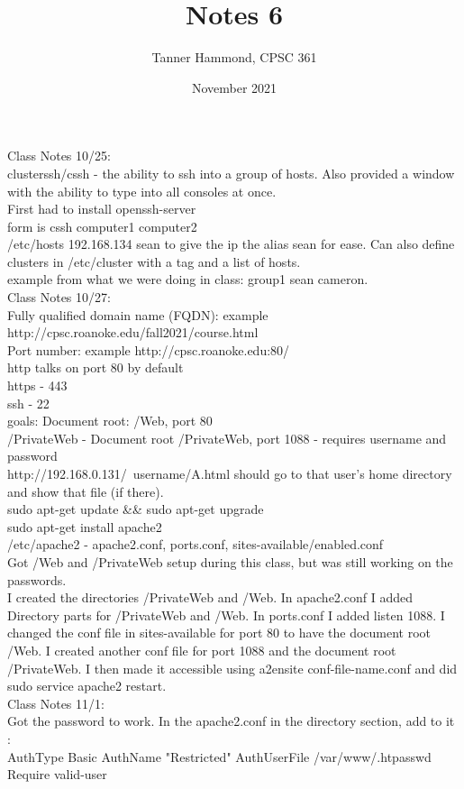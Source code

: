 \documentclass{article}
\title{Notes 6}
\author{Tanner Hammond, CPSC 361}
\date{November 2021}
\begin{document}
\maketitle

Class Notes 10/25:\\
clusterssh/cssh - the ability to ssh into a group of hosts. Also provided a window with the ability to type into all consoles at once. \\
First had to install openssh-server \\
form is cssh computer1 computer2 \\
/etc/hosts  192.168.134 sean to give the ip the alias sean for ease.
Can also define clusters in /etc/cluster with a tag and a list of hosts. \\
example from what we were doing in class: group1 sean cameron. \\


Class Notes 10/27:\\
Fully qualified domain name (FQDN): example http://cpsc.roanoke.edu/fall2021/course.html \\
Port number: example http://cpsc.roanoke.edu:80/ \\

http talks on port 80 by default \\
https - 443 \\
ssh - 22 \\

goals: Document root: /Web, port 80 \\
/PrivateWeb - Document root /PrivateWeb, port 1088 - requires username and password \\

http://192.168.0.131/~username/A.html should go to that user's home directory and show that file (if there). \\

sudo apt-get update && sudo apt-get upgrade \\
sudo apt-get install apache2 \\

/etc/apache2 - apache2.conf, ports.conf, sites-available/enabled.conf \\
Got /Web and /PrivateWeb setup during this class, but was still working on the passwords. \\
I created the directories /PrivateWeb and /Web. In apache2.conf I added Directory parts for /PrivateWeb and /Web. In ports.conf I added listen 1088. I changed the conf file in sites-available for port 80 to have the document root /Web. I created another conf file for port 1088 and the document root /PrivateWeb. I then made it accessible using a2ensite conf-file-name.conf and did sudo service apache2 restart. \\
Class Notes 11/1:\\
Got the password to work. In the apache2.conf in the directory section, add to it : \\
AuthType Basic
AuthName "Restricted"
AuthUserFile /var/www/.htpasswd
Require valid-user
\end{document}
